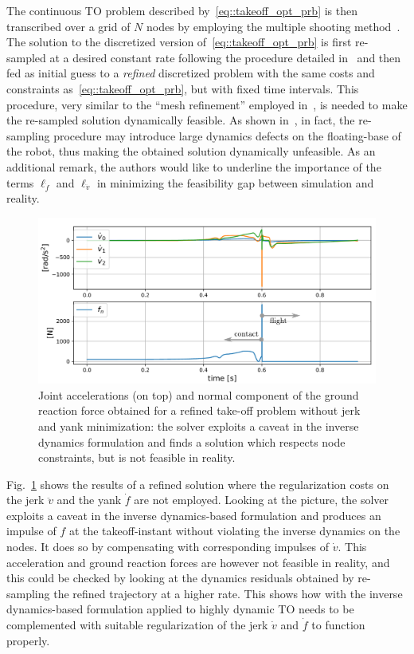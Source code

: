 The continuous TO problem described by~\ref{eq::takeoff_opt_prb} is then transcribed over a grid of $N$ nodes by employing the multiple shooting method~\cite{to::bock1984multiple}. The solution to the discretized version of~\eqref{eq::takeoff_opt_prb} is first re-sampled at a desired constant rate following the procedure detailed in~\cite{to::horizon_to} and then fed as initial guess to a \textit{refined} discretized problem with the same costs and constraints as~\eqref{eq::takeoff_opt_prb}, but with fixed time intervals. This procedure, very similar to the \enquote{mesh refinement} employed in~\cite{to::horizon_to}, is needed to make the re-sampled solution dynamically feasible. As shown in~\cite{to::horizon_to}, in fact, the re-sampling procedure may introduce large dynamics defects on the floating-base of the robot, thus making the obtained solution dynamically unfeasible. 
As an additional remark, the authors would like to underline the importance of the terms $\ell_{\dot{f}}$ and $\ell_{\ddot{v}}$ in minimizing the feasibility gap between simulation and reality.
\begin{figure}[t]
    \centering
    \includegraphics[width=1\columnwidth]{images/inv_dyn_caveat.pdf}
    \caption{Joint accelerations (on top) and normal component of the ground reaction force obtained for a refined take-off problem without jerk and yank minimization: the solver exploits a caveat in the inverse dynamics formulation and finds a solution which respects node constraints, but is not feasible in reality.}
    \label{fig:inv_dyn_caveat}
\end{figure}
Fig.~\ref{fig:inv_dyn_caveat} shows the results of a refined solution where the regularization costs on the jerk $\ddot{v}$ and the yank $\dot{f}$ are not employed. Looking at the picture, the solver exploits a caveat in the inverse dynamics-based formulation and produces an impulse of $f$ at the takeoff-instant without violating the inverse dynamics on the nodes. It does so by compensating with corresponding impulses of $\dot{v}$. This acceleration and ground reaction forces are however not feasible in reality, and this could be checked by looking at the dynamics residuals obtained by re-sampling the refined trajectory at a higher rate.
This shows how with the inverse dynamics-based formulation applied to highly dynamic TO needs to be complemented with suitable regularization of the jerk $\dot{v}$ and $\dot{f}$ to function properly.
